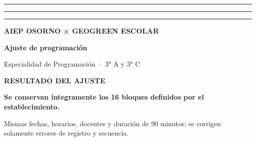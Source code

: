 \documentclass[9pt,a4paper]{article}
\begin{document}
\noindent
\colorbox{AIEPRed}{\rule{15mm}{0pt}\rule{0pt}{2.2mm}}%
\colorbox{GeoCyan}{\rule{15mm}{0pt}\rule{0pt}{2.2mm}}%
\colorbox{GeoGreen}{\rule{15mm}{0pt}\rule{0pt}{2.2mm}}%
\colorbox{AIEPNavy}{}

\vspace{4mm}
{\scriptsize\bfseries\color{AIEPRed}AIEP OSORNO × GEOGREEN ESCOLAR\par}
\vspace{1.5mm}
{\fontsize{24}{27}\selectfont\bfseries\color{AIEPNavy}Ajuste de programación\par}
\vspace{1mm}
{\large\color{AIEPMuted}Especialidad de Programación · 3° A y 3° C\par}

\vspace{4mm}
\begin{tcolorbox}[
  enhanced,
  colback=GeoGreenSoft,
  colframe=GeoGreen,
  boxrule=0.7pt,
  borderline west={2.2mm}{0pt}{GeoGreen},
  arc=1mm,
  left=4mm,right=4mm,top=2.5mm,bottom=2.5mm]
{\scriptsize\bfseries\color{GeoGreen}RESULTADO DEL AJUSTE}\par
{\normalsize\bfseries\color{AIEPNavy}Se conservan íntegramente los 16 bloques definidos por el establecimiento.}\par
{\small\color{AIEPInk}Mismas fechas, horarios, docentes y duración de 90 minutos; se corrigen solamente errores de registro y secuencia.}
\end{tcolorbox}
\end{document}
